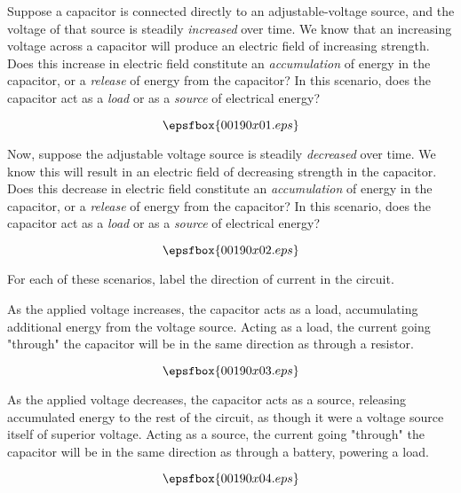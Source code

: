 

Suppose a capacitor is connected directly to an adjustable-voltage source, and the voltage of that source is steadily {\it increased} over time.  We know that an increasing voltage across a capacitor will produce an electric field of increasing strength.  Does this increase in electric field constitute an {\it accumulation} of energy in the capacitor, or a {\it release} of energy from the capacitor?  In this scenario, does the capacitor act as a {\it load} or as a {\it source} of electrical energy?

$$\epsfbox{00190x01.eps}$$

Now, suppose the adjustable voltage source is steadily {\it decreased} over time.  We know this will result in an electric field of decreasing strength in the capacitor.  Does this decrease in electric field constitute an {\it accumulation} of energy in the capacitor, or a {\it release} of energy from the capacitor?  In this scenario, does the capacitor act as a {\it load} or as a {\it source} of electrical energy?

$$\epsfbox{00190x02.eps}$$

For each of these scenarios, label the direction of current in the circuit.







As the applied voltage increases, the capacitor acts as a load, accumulating additional energy from the voltage source.  Acting as a load, the current going "through" the capacitor will be in the same direction as through a resistor.

$$\epsfbox{00190x03.eps}$$

As the applied voltage decreases, the capacitor acts as a source, releasing accumulated energy to the rest of the circuit, as though it were a voltage source itself of superior voltage.  Acting as a source, the current going "through" the capacitor will be in the same direction as through a battery, powering a load.

$$\epsfbox{00190x04.eps}$$






